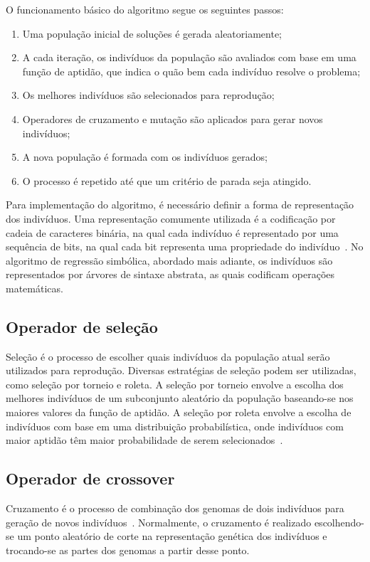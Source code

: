 O funcionamento básico do algoritmo segue os seguintes passos:
\begin{enumerate}
  \item Uma população inicial de soluções é gerada aleatoriamente;
  \item A cada iteração, os indivíduos da população são avaliados com base em uma função de aptidão, que indica o quão bem cada indivíduo resolve o problema;
  \item Os melhores indivíduos são selecionados para reprodução;
  \item Operadores de cruzamento e mutação são aplicados para gerar novos indivíduos;
  \item A nova população é formada com os indivíduos gerados;
  \item O processo é repetido até que um critério de parada seja atingido.
\end{enumerate}

Para implementação do algoritmo, é necessário definir a forma de representação dos indivíduos. Uma representação comumente utilizada é a codificação por cadeia de caracteres binária, na qual cada indivíduo é representado por uma sequência de bits, na qual cada bit representa uma propriedade do indivíduo~\cite{Katoch2021}. No algoritmo de regressão simbólica, abordado mais adiante, os indivíduos são representados por árvores de sintaxe abstrata, as quais codificam operações matemáticas.

\subsection{Operador de seleção}

Seleção é o processo de escolher quais indivíduos da população atual serão utilizados para reprodução. Diversas estratégias de seleção podem ser utilizadas, como seleção por torneio e roleta. A seleção por torneio envolve a escolha dos melhores indivíduos de um subconjunto aleatório da população baseando-se nos maiores valores da função de aptidão. A seleção por roleta envolve a escolha de indivíduos com base em uma distribuição probabilística, onde indivíduos com maior aptidão têm maior probabilidade de serem selecionados~\cite{Katoch2021}.

\subsection{Operador de crossover}

Cruzamento é o processo de combinação dos genomas de dois indivíduos para geração de novos indivíduos~\cite{galr,Katoch2021}. Normalmente, o cruzamento é realizado escolhendo-se um ponto aleatório de corte na representação genética dos indivíduos e trocando-se as partes dos genomas a partir desse ponto.

